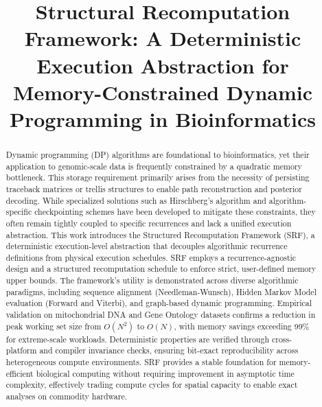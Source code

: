 \documentclass{bmcart}
\begin{document}
\begin{frontmatter}

\begin{fmbox}

\title{Structural Recomputation Framework: A Deterministic Execution Abstraction for Memory-Constrained Dynamic Programming in Bioinformatics}

\author[
  id=au1,
  addressref={aff1}
]{ }

\address[id=aff1]{
  ,
  ,
}

\end{fmbox}

\begin{abstract}
Dynamic programming (DP) algorithms are foundational to bioinformatics, yet their application to genomic-scale data is frequently constrained by a quadratic memory bottleneck. This storage requirement primarily arises from the necessity of persisting traceback matrices or trellis structures to enable path reconstruction and posterior decoding. While specialized solutions such as Hirschberg's algorithm and algorithm-specific checkpointing schemes have been developed to mitigate these constraints, they often remain tightly coupled to specific recurrences and lack a unified execution abstraction. This work introduces the Structured Recomputation Framework (SRF), a deterministic execution-level abstraction that decouples algorithmic recurrence definitions from physical execution schedules. SRF employs a recurrence-agnostic design and a structured recomputation schedule to enforce strict, user-defined memory upper bounds. The framework's utility is demonstrated across diverse algorithmic paradigms, including sequence alignment (Needleman-Wunsch), Hidden Markov Model evaluation (Forward and Viterbi), and graph-based dynamic programming. Empirical validation on mitochondrial DNA and Gene Ontology datasets confirms a reduction in peak working set size from $O(N^2)$ to $O(N)$, with memory savings exceeding 99\% for extreme-scale workloads. Deterministic properties are verified through cross-platform and compiler invariance checks, ensuring bit-exact reproducibility across heterogeneous compute environments. SRF provides a stable foundation for memory-efficient biological computing without requiring improvement in asymptotic time complexity, effectively trading compute cycles for spatial capacity to enable exact analyses on commodity hardware.
\end{abstract}

\begin{keyword}
\end{keyword}

\end{frontmatter}
\end{document}
